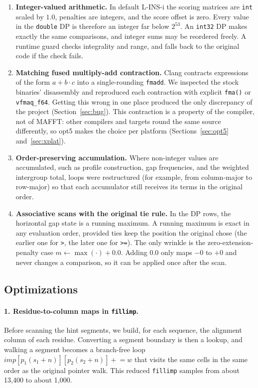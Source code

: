 \documentclass[11pt]{article}
\newcommand{\code}[1]{\texttt{#1}}
\begin{document}
\begin{enumerate}
\item \textbf{Integer-valued arithmetic.} In default L-INS-i the scoring matrices are
  \code{int} scaled by $1.0$, penalties are integers, and the score offset is zero. Every
  value in the \code{double} DP is therefore an integer far below $2^{53}$. An \code{int32}
  DP makes exactly the same comparisons, and integer sums may be reordered freely. A
  runtime guard checks integrality and range, and falls back to the original code if the
  check fails.
\item \textbf{Matching fused multiply-add contraction.} Clang contracts expressions of the
  form $a + b\cdot c$ into a single-rounding \code{fmadd}. We inspected the stock binaries'
  disassembly and reproduced each contraction with explicit \code{fma()} or
  \code{vfmaq\_f64}. Getting this wrong in one place produced the only discrepancy of the
  project (Section~\ref{sec:bug}). This contraction is a property of the compiler, not of
  MAFFT: other compilers and targets round the same source differently, so opt5 makes the
  choice per platform (Sections~\ref{sec:opt5} and~\ref{sec:xplat}).
\item \textbf{Order-preserving accumulation.} Where non-integer values are accumulated,
  such as profile construction, gap frequencies, and the weighted intergroup total, loops
  were restructured (for example, from column-major to row-major) so that each accumulator
  still receives its terms in the original order.
\item \textbf{Associative scans with the original tie rule.} In the DP rows, the horizontal
  gap state is a running maximum. A running maximum is exact in any evaluation order,
  provided ties keep the position the original chose (the earlier one for \code{>}, the
  later one for \code{>=}). The only wrinkle is the zero-extension-penalty case
  $m \leftarrow \max(\cdot) + 0.0$. Adding $0.0$ only maps $-0$ to $+0$ and never changes
  a comparison, so it can be applied once after the scan.
\end{enumerate}

\subsection{Optimizations}

\paragraph{1. Residue-to-column maps in \code{fillimp}.} Before scanning the hint segments,
we build, for each sequence, the alignment column of each residue. Converting a segment
boundary is then a lookup, and walking a segment becomes a branch-free loop
$\mathit{imp}[p_1(s_1{+}n)][p_2(s_2{+}n)] \mathrel{+}= w$ that visits the same cells in the
same order as the original pointer walk. This reduced \code{fillimp} samples from about
13{,}400 to about 1{,}000.
\end{document}
